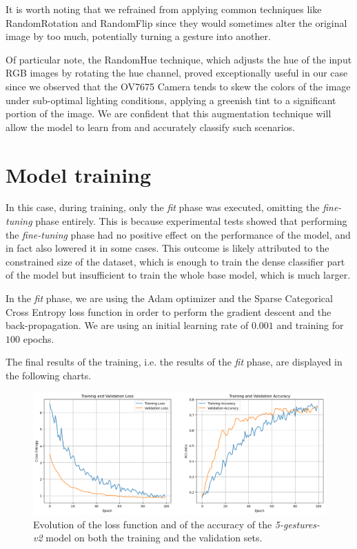 \documentclass{Configuration_Files/PoliMi3i_thesis}
\begin{document}
It is worth noting that we refrained from applying common techniques like RandomRotation and RandomFlip since they would sometimes alter the original image by too much, potentially turning a gesture into another. 

Of particular note, the RandomHue technique, which adjusts the hue of the input RGB images by rotating the hue channel, proved exceptionally useful in our case since we observed that the OV7675 Camera tends to skew the colors of the image under sub-optimal lighting conditions, applying a greenish tint to a significant portion of the image. We are confident that this augmentation technique will allow the model to learn from and accurately classify such scenarios.


\section{Model training}
\label{sec:5-v2-training}
In this case, during training, only the \textit{fit} phase was executed, omitting the\textit{ fine-tuning} phase entirely. This is because experimental tests showed that performing the \textit{fine-tuning} phase had no positive effect on the performance of the model, and in fact also lowered it in some cases. This outcome is likely attributed to the constrained size of the dataset, which is enough to train the dense classifier part of the model but insufficient to train the whole base model, which is much larger. 

In the \textit{fit} phase, we are using the Adam optimizer and the Sparse Categorical Cross Entropy loss function in order to perform the gradient descent and the back-propagation. We are using an initial learning rate of $0.001$ and training for $100$ epochs.

The final results of the training, i.e. the results of the \textit{fit} phase, are displayed in the following charts.

\begin{figure}[H]
  \centering
\includegraphics[width=\textwidth]{Figures/5-gestures-v2/5_v2_loss.png}
\caption{Evolution of the loss function and of the accuracy of the \textit{5-gestures-v2} model on both the training and the validation sets.}
\label{fig:5_v2_loss}
\end{figure}
\end{document}
